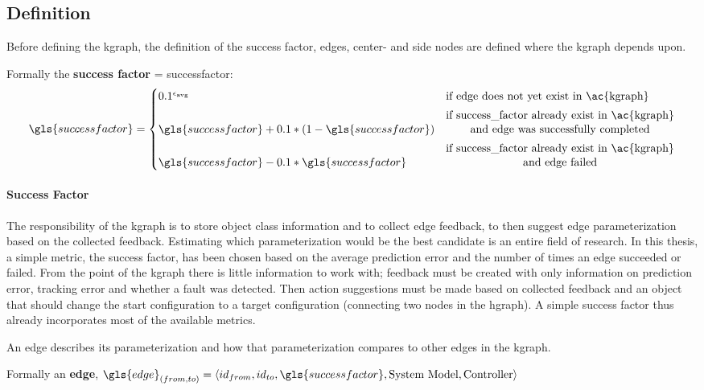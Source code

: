 \subsection{Definition}%
\label{subsec:kgraph_definition}
Before defining the \ac{kgraph}, the definition of the success factor, edges, center- and side nodes are defined where the \ac{kgraph} depends upon.\bs

Formally the \textbf{success factor} = \gls{successfactor}:
\[\gls{successfactor} =
  \begin{cases} 0.1^{\epsilon_{\textrm {avg}}}& \textrm {if edge does not yet exist in \ac{kgraph}}\\[5px]
    \gls{successfactor} + 0.1*(1-\gls{successfactor}) & \textrm{\shortstack{if success\_factor already exist in \ac{kgraph}\\ and edge was successfully completed}}\\[5px]
  \gls{successfactor} - 0.1*\gls{successfactor} & \textrm{\shortstack{if success\_factor already exist in \ac{kgraph}\\ and edge failed}}
\end{cases}\]


\paragraph{Success Factor} The responsibility of the \ac{kgraph} is to store object class information and to collect edge feedback, to then suggest edge parameterization based on the collected feedback. Estimating which parameterization would be the best candidate is an entire field of research. In this thesis, a simple metric, the success factor, has been chosen based on the average prediction error and the number of times an edge succeeded or failed. From the point of the \ac{kgraph} there is little information to work with; feedback must be created with only information on prediction error, tracking error and whether a fault was detected. Then action suggestions must be made based on collected feedback and an object that should change the start configuration to a target configuration (connecting two nodes in the \ac{hgraph}). A simple success factor thus already incorporates most of the available metrics.\bs

\noindent An edge describes its parameterization and how that parameterization compares to other edges in the \ac{kgraph}.\bs

Formally an \textbf{edge}, $\gls{edge}_{(from, to)} = \left\langle id_{from}, id_{to}, \gls{successfactor}, \textrm{System Model}, \textrm{Controller}\right\rangle$\bs

